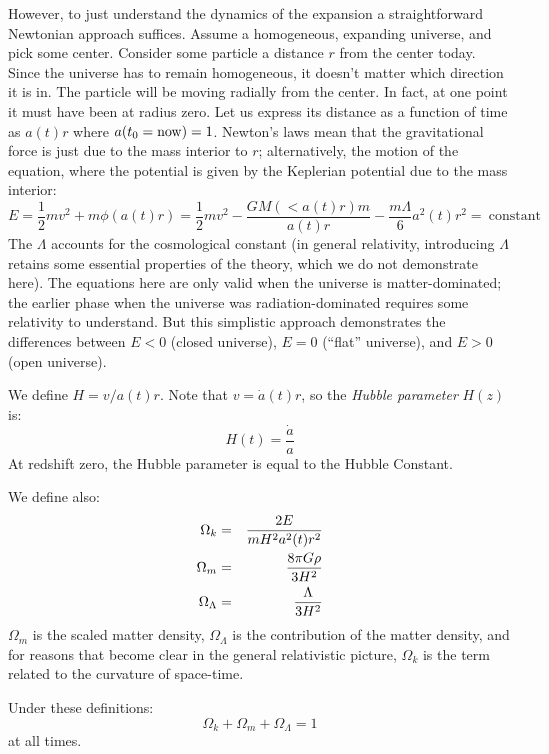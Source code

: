 However, to just understand the dynamics of the expansion a
straightforward Newtonian approach suffices.  Assume a homogeneous,
expanding universe, and pick some center.  Consider some particle a
distance $r$ from the center today. Since the universe has to remain
homogeneous, it doesn't matter which direction it is in.  The particle
will be moving radially from the center. In fact, at one point it must
have been at radius zero. Let us express its distance as a function of
time as $a(t)r$ where $a(t_0 = {\rm now}) = 1$. Newton's laws mean
that the gravitational force is just due to the mass interior to $r$;
alternatively, the motion of the %
equation, where the potential is given by the Keplerian potential due
to the mass interior:
\begin{equation}
\label{eq:energy}
E = \frac{1}{2} m v^2 + m \phi(a(t) r) = \frac{1}{2} m v^2 -
\frac{GM(<a(t) r)m}{a(t) r} - \frac{m\Lambda}{6} a^2(t) r^2 =
\mathrm{~constant}
\end{equation}
The $\Lambda$ accounts for the cosmological constant (in general
relativity, introducing $\Lambda$ retains some essential properties of
the theory, which we do not demonstrate here). The equations here are
only valid when the universe is matter-dominated; the earlier phase
when the universe was radiation-dominated requires some relativity to
understand. But this simplistic approach demonstrates the differences
between $E<0$ (closed universe), $E=0$ (``flat'' universe), and $E>0$
(open universe).

We define $H=v/a(t)r$. Note that $v={\dot a}(t) r$, so the {\it Hubble
  parameter} $H(z)$ is:
\begin{equation}
  H(t) = \frac{\dot a}{a}
\end{equation}
At redshift zero, the Hubble parameter is equal to the Hubble
Constant.

We define also:
\begin{eqnarray}
\Omega_k &=& \frac{2E}{mH^2a^2(t) r^2} \cr
\Omega_m &=& \frac{8\pi G\rho}{3H^2}\cr
\Omega_\Lambda &=& \frac{\Lambda}{3H^2} 
\end{eqnarray}
$\Omega_m$ is the scaled matter density, $\Omega_\Lambda$ is the
contribution of the matter density, and for reasons that become clear
in the general relativistic picture, $\Omega_k$ is the term related to
the curvature of space-time.

Under these definitions:
\begin{equation}
\Omega_k + \Omega_m + \Omega_\Lambda = 1
\end{equation}
at all times.

